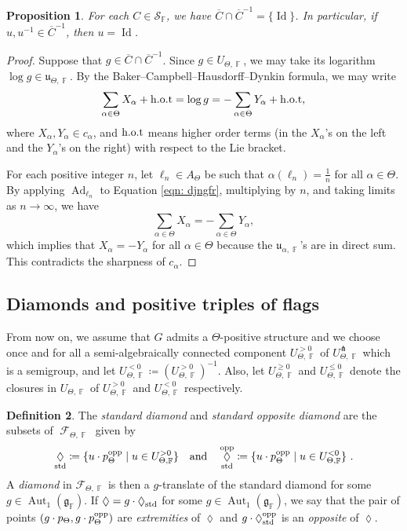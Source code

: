 \documentclass{amsart}
\theoremstyle{plain}
\newtheorem{proposition}{Proposition}[section]
\theoremstyle{definition}
\newtheorem{definition}[proposition]{Definition}
\DeclareMathOperator{\Aut}{Aut}
\DeclareMathOperator{\Id}{Id}
\DeclareMathOperator{\Ad}{Ad}
\DeclareMathOperator{\Diam}{\lozenge}
\DeclareMathOperator{\Fc}{\mathcal{F}}
\DeclareMathOperator{\Fb}{{\mathbb{F}}}
\newcommand{\opp}{\textnormal{opp}}
\newcommand{\std}{\textnormal{std}}
\newcommand{\1}{\mathbf{1}}
\begin{document}
\begin{proposition}
\label{propo:AcuteSemigroup}
    For each $C\in\mathcal S_{\Fb}$, we have $\overline{C}\cap\overline{C}^{-1}=\{\Id\}$. In particular, if $u,u^{-1}\in\overline{C}^{-1}$, then $u=\Id$. 
\end{proposition}
\begin{proof} 
Suppose that $g\in \overline{C}\cap\overline C^{-1}$.
Since $g\in U_{\Theta,\Fb}$, we may take its logarithm $\log g\in\mathfrak u_{\Theta,\Fb}$. By the Baker--Campbell--Hausdorff--Dynkin formula, we may write
\begin{align}\label{eqn: djngfr}
\sum_{\alpha\in\Theta}X_\alpha+{\rm h.o.t}=\log g=-\sum_{\alpha\in\Theta}Y_\alpha+{\rm h.o.t},
\end{align}
where $X_\alpha,Y_\alpha\in c_\alpha$, and ${\rm h.o.t}$ means higher order terms (in the $X_\alpha$'s on the left and the $Y_\alpha$'s on the right) with respect to the Lie bracket. 

For each positive integer $n$, let $\ell_n\in A_{\Theta}$ be such that $\alpha(\ell_n)=\frac{1}{n}$ for all $\alpha\in\Theta$.
By applying $\Ad_{\ell_n}$ to Equation \eqref{eqn: djngfr}, multiplying by $n$, and taking limits as $n\to\infty$, we have 
\[\sum_{\alpha\in\Theta}X_\alpha=-\sum_{\alpha\in\Theta}Y_\alpha,\]
which implies that $X_\alpha=-Y_\alpha$ for all $\alpha\in\Theta$ because the $\mathfrak u_{\alpha,\Fb}$'s are in direct sum. This contradicts the sharpness of $c_\alpha$.
\end{proof}




\subsection{Diamonds and positive triples of flags}
\label{s: Diamonds}
From now on, we assume that $G$ admits a $\Theta$-positive structure and we choose once and for all a semi-algebraically connected component $U_{\Theta,\Fb}^{>0}$ of $U_{\Theta,\Fb}^\pitchfork$ which is a semigroup, and let $U_{\Theta,\Fb}^{<0}\coloneqq(U_{\Theta,\Fb}^{>0})^{-1}$. Also, let $U_{\Theta,\Fb}^{\ge 0}$ and $U_{\Theta,\Fb}^{\le 0}$ denote the closures in $U_{\Theta,\Fb}$ of $U_{\Theta,\Fb}^{>0}$ and $U_{\Theta,\Fb}^{<0}$ respectively.


\begin{definition}
The \emph{standard diamond} and \emph{standard opposite diamond} are the subsets of $\Fc_{\Theta,\Fb}$ given by 
\[\Diam_{\std} \coloneqq \{u\cdot p_\Theta^\opp \mid u\in U_{\Theta,\Fb}^{>0}\}\quad\text{and}\quad\Diam_{\std}^\opp \coloneqq \{ u \cdot p_\Theta^\opp \mid u \in U_{\Theta,\Fb}^{<0}\}~.\]
A \emph{diamond} in $\mathcal F_{\Theta,\Fb}$ is then a $g$-translate of the standard diamond for some $g \in \Aut_1(\mathfrak{g_{\Fb}})$. If $\Diam=g\cdot \Diam_{\std}$ for some $g \in \Aut_1(\mathfrak{g_{\Fb}})$, we say that the pair of points $(g\cdot p_{\Theta},g\cdot p_{\Theta}^{\rm opp})$ are \emph{extremities} of $\Diam$ and $g\cdot \Diam_{\std}^{\rm opp}$ is an \emph{opposite} of $\Diam$. 
\end{definition}
\end{document}

